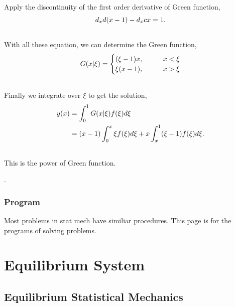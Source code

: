 \documentclass[letterpaper,10pt,english]{sphinxmanual}
\begin{document}
Apply the discontinuity of the first order derivative of Green function,
\begin{gather}
\begin{split}d_x d (x-1)- d_x cx = 1.\end{split}\notag\\\begin{split}\end{split}\notag
\end{gather}
With all these equation, we can determine the Green function,
\begin{gather}
\begin{split}G(x\vert\xi) = \begin{cases}  (\xi -1 ) x , & \qquad x<\xi  \\ \xi(x-1), & \qquad x>\xi  \end{cases}\end{split}\notag\\\begin{split}\end{split}\notag
\end{gather}
Finally we integrate over $\xi$ to get the solution,
\begin{gather}
\begin{split}y(x) &= \int_0^1  G(x\vert \xi) f(\xi) d\xi  \\
& = (x-1)\int_0^x \xi f(\xi) d\xi + x \int_x^1 (\xi -1) f(\xi) d\xi .\end{split}\notag\\\begin{split}\end{split}\notag
\end{gather}
This is the power of Green function.

.


\subsection{Program}
\label{vocabulary/program:program}\label{vocabulary/program::doc}
Most problems in stat mech have similiar procedures. This page is for the programs of solving problems.


\chapter{Equilibrium System}
\label{index:equilibrium-system}

\section{Equilibrium Statistical Mechanics}
\label{equilibrium/main:equilibrium-statistical-mechanics}\label{equilibrium/main::doc}
\end{document}
